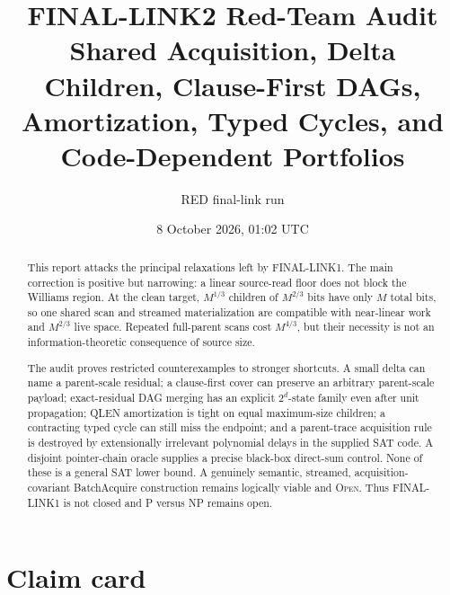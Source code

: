 \documentclass[11pt]{article}
\title{FINAL-LINK2 Red-Team Audit\\
Shared Acquisition, Delta Children, Clause-First DAGs,\\
Amortization, Typed Cycles, and Code-Dependent Portfolios}
\author{RED final-link run}
\date{8 October 2026, 01:02 UTC}
\newcommand{\Open}{\textsc{Open}}
\begin{document}
\maketitle

\begin{abstract}
This report attacks the principal relaxations left by FINAL-LINK1.  The main
correction is positive but narrowing: a linear source-read floor does not
block the Williams region.  At the clean target, $M^{1/3}$ children of
$M^{2/3}$ bits have only $M$ total bits, so one shared scan and streamed
materialization are compatible with near-linear work and $M^{2/3}$ live
space.  Repeated full-parent scans cost $M^{4/3}$, but their necessity is not
an information-theoretic consequence of source size.

The audit proves restricted counterexamples to stronger shortcuts.  A small
delta can name a parent-scale residual; a clause-first cover can preserve an
arbitrary parent-scale payload; exact-residual DAG merging has an explicit
$2^d$-state family even after unit propagation; QLEN amortization is tight on
equal maximum-size children; a contracting typed cycle can still miss the
endpoint; and a parent-trace acquisition rule is destroyed by extensionally
irrelevant polynomial delays in the supplied SAT code.  A disjoint
pointer-chain oracle supplies a precise black-box direct-sum control.  None of
these is a general SAT lower bound.  A genuinely semantic, streamed,
acquisition-covariant BatchAcquire construction remains logically viable and
\Open.  Thus FINAL-LINK1 is not closed and P versus NP remains open.
\end{abstract}

\section{Claim card}

\begin{center}
\end{center}
\end{document}
